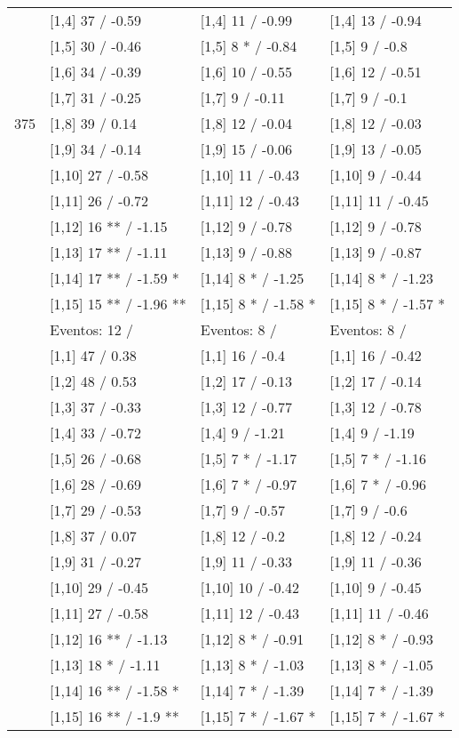 \begin{table}
\begin{tabular}[t]{llll}
 & {}[1,4] 37  / -0.59 & {}[1,4] 11  / -0.99 & {}[1,4] 13  / -0.94\\
 & {}[1,5] 30  / -0.46 & {}[1,5] 8 * / -0.84 & {}[1,5] 9  / -0.8\\
 & {}[1,6] 34  / -0.39 & {}[1,6] 10  / -0.55 & {}[1,6] 12  / -0.51\\
 & {}[1,7] 31  / -0.25 & {}[1,7] 9  / -0.11 & {}[1,7] 9  / -0.1\\
375 & {}[1,8] 39  / 0.14 & {}[1,8] 12  / -0.04 & {}[1,8] 12  / -0.03\\
\addlinespace
 & {}[1,9] 34  / -0.14 & {}[1,9] 15  / -0.06 & {}[1,9] 13  / -0.05\\
 & {}[1,10] 27  / -0.58 & {}[1,10] 11  / -0.43 & {}[1,10] 9  / -0.44\\
 & {}[1,11] 26  / -0.72 & {}[1,11] 12  / -0.43 & {}[1,11] 11  / -0.45\\
 & {}[1,12] 16 ** / -1.15 & {}[1,12] 9  / -0.78 & {}[1,12] 9  / -0.78\\
 & {}[1,13] 17 ** / -1.11 & {}[1,13] 9  / -0.88 & {}[1,13] 9  / -0.87\\
\addlinespace
 & {}[1,14] 17 ** / -1.59 * & {}[1,14] 8 * / -1.25 & {}[1,14] 8 * / -1.23\\
 & {}[1,15] 15 ** / -1.96 ** & {}[1,15] 8 * / -1.58 * & {}[1,15] 8 * / -1.57 *\\
 & Eventos:  12 / & Eventos:  8 / & Eventos:  8 /\\
 & {}[1,1] 47  / 0.38 & {}[1,1] 16  / -0.4 & {}[1,1] 16  / -0.42\\
 & {}[1,2] 48  / 0.53 & {}[1,2] 17  / -0.13 & {}[1,2] 17  / -0.14\\
\addlinespace
 & {}[1,3] 37  / -0.33 & {}[1,3] 12  / -0.77 & {}[1,3] 12  / -0.78\\
 & {}[1,4] 33  / -0.72 & {}[1,4] 9  / -1.21 & {}[1,4] 9  / -1.19\\
 & {}[1,5] 26  / -0.68 & {}[1,5] 7 * / -1.17 & {}[1,5] 7 * / -1.16\\
 & {}[1,6] 28  / -0.69 & {}[1,6] 7 * / -0.97 & {}[1,6] 7 * / -0.96\\
 & {}[1,7] 29  / -0.53 & {}[1,7] 9  / -0.57 & {}[1,7] 9  / -0.6\\
\addlinespace
500 & {}[1,8] 37  / 0.07 & {}[1,8] 12  / -0.2 & {}[1,8] 12  / -0.24\\
 & {}[1,9] 31  / -0.27 & {}[1,9] 11  / -0.33 & {}[1,9] 11  / -0.36\\
 & {}[1,10] 29  / -0.45 & {}[1,10] 10  / -0.42 & {}[1,10] 9  / -0.45\\
 & {}[1,11] 27  / -0.58 & {}[1,11] 12  / -0.43 & {}[1,11] 11  / -0.46\\
 & {}[1,12] 16 ** / -1.13 & {}[1,12] 8 * / -0.91 & {}[1,12] 8 * / -0.93\\
\addlinespace
 & {}[1,13] 18 * / -1.11 & {}[1,13] 8 * / -1.03 & {}[1,13] 8 * / -1.05\\
 & {}[1,14] 16 ** / -1.58 * & {}[1,14] 7 * / -1.39 & {}[1,14] 7 * / -1.39\\
 & {}[1,15] 16 ** / -1.9 ** & {}[1,15] 7 * / -1.67 * & {}[1,15] 7 * / -1.67 *\\
\bottomrule
\end{tabular}
\end{table}
